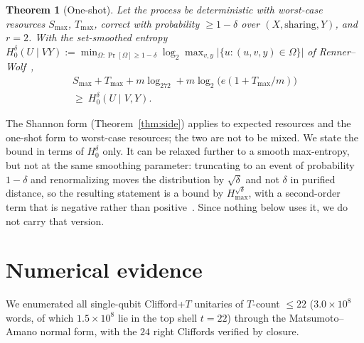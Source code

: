 \documentclass[aps,prx,twocolumn,superscriptaddress,nofootinbib,longbibliography]{revtex4-2}
\theoremstyle{plain}
\newtheorem{theorem}{Theorem}
\theoremstyle{definition}
\theoremstyle{remark}
\begin{document}
\begin{theorem}[One-shot]\label{thm:oneshot}
Let the process be deterministic with worst-case resources $S_{\max}$, $T_{\max}$, correct with probability $\ge1-\delta$ over $(X,\text{sharing},Y)$, and $r=2$. With the set-smoothed entropy $H_0^\delta(U\mid VY):=\min_{\Omega:\Pr[\Omega]\ge1-\delta}\log_2\max_{v,y}|\{u:(u,v,y)\in\Omega\}|$ of Renner--Wolf~\cite{RennerWolf},
\begin{multline}
S_{\max}+T_{\max}+m\log_272+m\log_2\!\big(e(1+T_{\max}/m)\big)\\
\ge\ H_0^\delta(U\mid V,Y).
\end{multline}
\end{theorem}
The Shannon form (Theorem~\ref{thm:side}) applies to expected resources and the one-shot form to worst-case resources; the two are not to be mixed. We state the bound in terms of $H_0^\delta$ only. It can be relaxed further to a smooth max-entropy, but not at the same smoothing parameter: truncating to an event of probability $1-\delta$ and renormalizing moves the distribution by $\sqrt\delta$ and not $\delta$ in purified distance, so the resulting statement is a bound by $H^{\sqrt\delta}_{\max}$, with a second-order term that is negative rather than positive~\cite{TomamichelHayashi}. Since nothing below uses it, we do not carry that version.

\section{Numerical evidence}\label{sec:num}

We enumerated all single-qubit Clifford+$T$ unitaries of $T$-count $\le22$ ($3.0\times10^8$ words, of which $1.5\times10^8$ lie in the top shell $t=22$) through the Matsumoto--Amano normal form, with the $24$ right Cliffords verified by closure.
\end{document}
